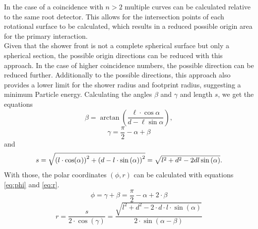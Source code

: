 \documentclass[abstract,toc,los,lof,english,10pt,glossary,acronyms,lotl]{jluthesis}
\begin{document}
In the case of a coincidence with $n>2$ multiple curves can be calculated relative to the same root detector. This allows for the intersection points of each rotational surface to be calculated, which results in a reduced possible origin area for the primary interaction. \\
Given that the shower front is not a complete spherical surface but only a spherical section, the possible origin directions can be reduced with this approach. In the case of higher coincidence numbers, the possible direction can be reduced further. Additionally to the possible directions, this approach also provides a lower limit for the shower radius and footprint radius, suggesting a minimum Particle energy.
Calculating the angles $\beta$ and $\gamma$ and length $s$, we get the equations
\begin{equation*}
	\beta = \arctan\left(\frac{\ell\cdot\cos\alpha}{d - \ell\sin\alpha}\right),
\end{equation*}
\begin{equation*}
	\gamma = \frac{\pi}{2} - \alpha + \beta
\end{equation*}
and
\begin{equation*}
	s = \sqrt{\left(l\cdot\cos\hspace{-2pt}\left(\alpha\right)\right)^2 + \left(d - l\cdot\sin\left(\alpha\right)\right)^2} = \sqrt{l^2 + d^2 - 2dl\sin\left(\alpha\right)}.
\end{equation*}
With those, the polar coordinates $(\phi, r)$ can be calculated with equations \ref{eq:phi} and \ref{eq:r}.
\begin{equation}\label{eq:phi}
	\phi = \gamma + \beta = \frac{\pi}{2} - \alpha + 2\cdot\beta
\end{equation}
\begin{equation}\label{eq:r}
	r = \frac{s}{2\cdot\cos\left(\gamma\right)} = \frac{\sqrt{l^2 + d^2 - 2{\cdot}d{\cdot}l{\cdot}\sin\left(\alpha\right)}}{2\cdot\sin\left(\alpha - \beta\right)}
\end{equation}
\end{document}
